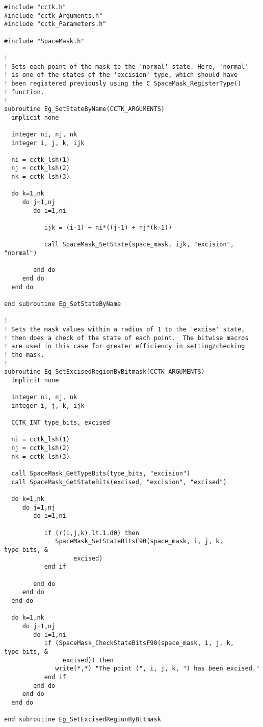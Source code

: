 \documentclass{article}
\begin{document}
\begin{verbatim}
#include "cctk.h"
#include "cctk_Arguments.h"
#include "cctk_Parameters.h"

#include "SpaceMask.h"

!
! Sets each point of the mask to the 'normal' state. Here, 'normal'
! is one of the states of the 'excision' type, which should have
! been registered previously using the C SpaceMask_RegisterType()
! function.
!
subroutine Eg_SetStateByName(CCTK_ARGUMENTS)
  implicit none

  integer ni, nj, nk
  integer i, j, k, ijk

  ni = cctk_lsh(1)
  nj = cctk_lsh(2)
  nk = cctk_lsh(3)

  do k=1,nk
     do j=1,nj
        do i=1,ni
           
           ijk = (i-1) + ni*((j-1) + nj*(k-1))

           call SpaceMask_SetState(space_mask, ijk, "excision", "normal")
  
        end do
     end do
  end do

end subroutine Eg_SetStateByName

!
! Sets the mask values within a radius of 1 to the 'excise' state,
! then does a check of the state of each point.  The bitwise macros
! are used in this case for greater efficiency in setting/checking
! the mask.
!
subroutine Eg_SetExcisedRegionByBitmask(CCTK_ARGUMENTS)
  implicit none

  integer ni, nj, nk
  integer i, j, k, ijk

  CCTK_INT type_bits, excised

  ni = cctk_lsh(1)
  nj = cctk_lsh(2)
  nk = cctk_lsh(3)

  call SpaceMask_GetTypeBits(type_bits, "excision")
  call SpaceMask_GetStateBits(excised, "excision", "excised")

  do k=1,nk
     do j=1,nj
        do i=1,ni

           if (r(i,j,k).lt.1.d0) then
              SpaceMask_SetStateBitsF90(space_mask, i, j, k, type_bits, &
                   excised)
           end if

        end do
     end do
  end do

  do k=1,nk
     do j=1,nj
        do i=1,ni
           if (SpaceMask_CheckStateBitsF90(space_mask, i, j, k, type_bits, &
                excised)) then
              write(*,*) "The point (", i, j, k, ") has been excised."
           end if
        end do
     end do
  end do

end subroutine Eg_SetExcisedRegionByBitmask
\end{verbatim}
\end{document}
